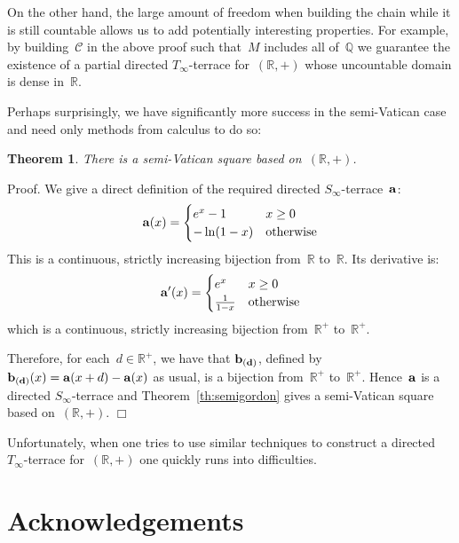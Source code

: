 \documentclass[12pt,a4paper]{article}
\newtheorem{thm}{Theorem}
\newcommand{\R}{\mathbb{R}}
\newcommand{\Q}{\mathbb{Q}}
\newcommand{\qed}{\unskip\protect\nolinebreak\mbox{\quad$\Box$}\vspace{3mm}}
\begin{document}
On the other hand, the large amount of freedom when building the chain while it is still countable allows us to add potentially interesting properties.  For example, by building~$\mathcal{C}$ in the above proof such that~$M$ includes all of~$\Q$ we guarantee the existence of a partial directed $T_{\infty}$-terrace for~$(\R,+)$ whose uncountable domain is dense in~$\R$.


Perhaps surprisingly, we have significantly more success in the semi-Vatican case and need only methods from calculus to do so:

\begin{thm}\label{th:svr}
There is a semi-Vatican square based on~$(\R,+)$.
\end{thm} 

\noindent
Proof.   We give a direct definition of the required directed $S_{\infty}$-terrace~${\bf a}$:
\begin{equation*}
    {\bf a}(x) = \begin{cases}
               e^x   -1            & x \geq 0\\
               -\ln (1-x)       & \text{otherwise}
           \end{cases}
\end{equation*}
This is a continuous, strictly increasing bijection from~$\R$ to~$\R$.  Its derivative is:
\begin{equation*}
    {\bf a}'(x) = \begin{cases}
               e^x               & x \geq 0\\
              \frac{1}{1-x}       & \text{otherwise}
           \end{cases}
\end{equation*}
which is a continuous, strictly increasing bijection from~$\R^+$ to~$\R^+$.

Therefore, for each~$d \in \R^+$, we have that ${\bf b_{(d)}}$, defined by ${\bf b_{(d)}}(x) = {\bf a}(x+d) - {\bf a}(x)$ as usual, is a bijection from~$\R^+$ to~$\R^+$.  Hence~${\bf a}$ is a directed $S_{\infty}$-terrace and Theorem~\ref{th:semigordon} gives a semi-Vatican square based on~$(\R,+)$.
\qed


Unfortunately, when one tries to use similar techniques to construct a 
directed $T_{\infty}$-terrace for~$(\R,+)$ one quickly runs into difficulties.




\section*{Acknowledgements}
\end{document}

